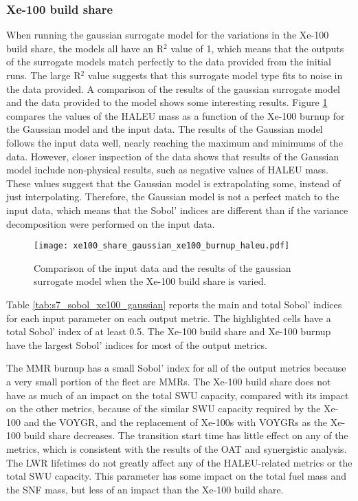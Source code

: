 \subsubsection{Xe-100 build share}
When running the gaussian surrogate model for the variations in the Xe-100 build 
share, the models all  have an R$^2$ value of 1, which means that the outputs of 
the surrogate models match perfectly to the data provided from the initial 
\Cyclus runs. The large R$^2$ value suggests that this surrogate model type 
fits to noise in the data provided. A comparison of the results of the 
gaussian surrogate model and the data provided to the model shows some interesting 
results. Figure \ref{fig:s7_xe100_gaussian} compares the values of the
\gls{HALEU} mass as a function of the Xe-100 burnup for the Gaussian model 
and the input data. The results of the Gaussian model follows the input 
data well, nearly reaching the maximum and minimums of the data. However, 
closer inspection of the data shows that results of the Gaussian model 
include non-physical results, such as negative values of \gls{HALEU} mass. 
These values suggest that the Gaussian model is extrapolating some, instead 
of just interpolating. Therefore, the Gaussian model is not a perfect 
match to the input data, which means that the Sobol' indices are different 
than if the variance decomposition were performed on the input data. 

\begin{figure}
    \centering 
    \texttt{[image: xe100\_share\_gaussian\_xe100\_burnup\_haleu.pdf]}
    \caption{Comparison of the input data and the results of the gaussian 
    surrogate model when the Xe-100 build share is varied. }
    \label{fig:s7_xe100_gaussian}
\end{figure}

Table \ref{tab:s7_sobol_xe100_gaussian} reports the main and total Sobol' indices 
for each input parameter on each output metric. The highlighted cells have 
a total Sobol' index of at least 0.5. The Xe-100 build share and Xe-100 
burnup have the largest Sobol' indices for most of the output metrics. 

The \gls{MMR} burnup has a small Sobol' index for all of the output metrics
because a very small portion of the fleet are \glspl{MMR}. The Xe-100 build share 
does not have as much of an impact on the total \gls{SWU} capacity, compared 
with its impact on the other metrics, because of the similar \gls{SWU} 
capacity required by the Xe-100 and the VOYGR, and the replacement of Xe-100s 
with VOYGRs as the Xe-100 build share decreases. The transition start time 
has little effect on any of the metrics, which is consistent with the 
results of the \gls{OAT} and synergistic analysis. The \gls{LWR} lifetimes 
do not greatly affect any of the \gls{HALEU}-related metrics or the 
total \gls{SWU} capacity. This parameter has some impact on the total 
fuel mass and the \gls{SNF} mass, but less of an impact than the Xe-100 
build share. 

